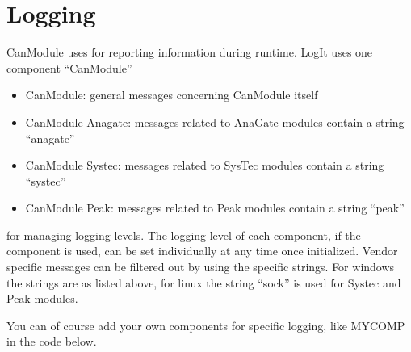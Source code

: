 \documentclass[letterpaper,10pt,english]{sphinxmanual}
\begin{document}
\begin{sphinxVerbatim}[commandchars=\\\{\}]
     
      
  
  
\end{sphinxVerbatim}


\chapter{Logging}
\label{\detokenize{logging:logging}}\label{\detokenize{logging::doc}}
CanModule uses  for reporting information during runtime. LogIt uses one component “CanModule”
\begin{itemize}
\item {} 
CanModule: general messages concerning CanModule itself

\item {} 
CanModule Anagate: messages related to AnaGate modules contain a string “anagate”

\item {} 
CanModule Systec: messages related to SysTec modules contain a string “systec”

\item {} 
CanModule Peak: messages related to Peak modules contain a string “peak”

\end{itemize}

for managing logging levels. The logging level of each component, if the component is used, can be set individually
at any time once initialized. Vendor specific messages can be filtered out by using the specific strings.
For windows the strings are as listed above, for linux the string “sock” is used for Systec and Peak modules.

You can of course add your own components for specific logging, like MYCOMP in the code below.
\end{document}
